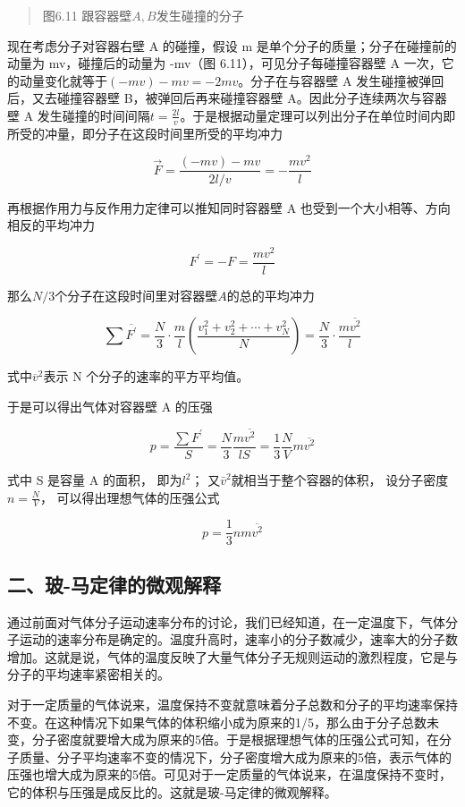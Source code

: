 \begin{quote}
图6.11 跟容器壁\(A, B\)发生碰撞的分子
\end{quote}

现在考虑分子对容器右壁 A 的碰撞，假设 m
是单个分子的质量；分子在碰撞前的动量为 mv，碰撞后的动量为 -mv（图
6.11），可见分子每碰撞容器壁 A
一次，它的动量变化就等于\((-mv) - mv = -2mv\)。分子在与容器壁 A
发生碰撞被弹回后，又去碰撞容器壁 B，被弹回后再来碰撞容器壁
A。因此分子连续两次与容器壁 A
发生碰撞的时间间隔\(t = \frac{2l}{v}\)。于是根据动量定理可以列出分子在单位时间内即所受的冲量，即分子在这段时间里所受的平均冲力

\[
\vec F=\frac{(-mv)-mv}{2l/v}=-\frac{mv^2}{l}
\]

再根据作用力与反作用力定律可以推知同时容器壁 A
也受到一个大小相等、方向相反的平均冲力

\[
F ^ {\prime} = - F = \frac {m v ^ {2}}{l}
\]

那么\(N / 3\)个分子在这段时间里对容器壁\(A\)的总的平均冲力

\[
\sum \overline{F^\prime}=\frac{N}{3}\cdot\frac{m}{l}\left(\frac{v_1^2+v_2^2+\cdots+v_N^2}{N}\right)=\frac{N}{3}\cdot\frac{m\overline{v^2}}{l}
\]

式中\(\overline{v}^{2}\)表示 N 个分子的速率的平方平均值。

于是可以得出气体对容器壁 A 的压强

\[
p=\frac{\sum F^\prime}{S}=\frac{N}{3}\frac{m\overline{v^2}}{lS}=\frac13\frac{N}{V}m\overline{v^2}
\]

式中 S 是容量 A 的面积， 即为\(l^{2}\)；
又\(\bar{v}^{2}\)就相当于整个容器的体积，
设分子密度\(n = \frac{N}{V}\)， 可以得出理想气体的压强公式

\[
p=\frac13nm\overline{v^2}
\]

\subsection{二、玻-马定律的微观解释}\label{ux4e8cux73bb-ux9a6cux5b9aux5f8bux7684ux5faeux89c2ux89e3ux91ca}

通过前面对气体分子运动速率分布的讨论，我们已经知道，在一定温度下，气体分子运动的速率分布是确定的。温度升高时，速率小的分子数减少，速率大的分子数增加。这就是说，气体的温度反映了大量气体分子无规则运动的激烈程度，它是与分子的平均速率紧密相关的。

对于一定质量的气体说来，温度保持不变就意味着分子总数和分子的平均速率保持不变。在这种情况下如果气体的体积缩小成为原来的1/5，那么由于分子总数未变，分子密度就要增大成为原来的5倍。于是根据理想气体的压强公式可知，在分子质量、分子平均速率不变的情况下，分子密度增大成为原来的5倍，表示气体的压强也增大成为原来的5倍。可见对于一定质量的气体说来，在温度保持不变时，它的体积与压强是成反比的。这就是玻-马定律的微观解释。

